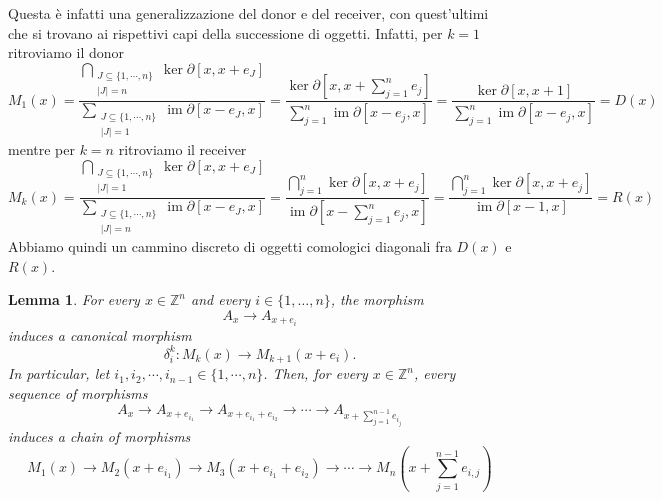 \documentclass[a4paper]{article}
\DeclareMathOperator{\im}{im}
\newtheorem{lemma}[theorem]{Lemma}
\begin{document}
Questa è infatti una generalizzazione del donor e del receiver, con quest'ultimi
che si trovano ai rispettivi capi della successione di oggetti.
Infatti, per \(k=1\) ritroviamo il donor
\[
    M_1(x) = \frac{
        \displaystyle
        \bigcap_{
            \substack{
                J \subseteq \{1, \cdots, n\} \\
                |J| = n
            }
        } \ker\partial\left[
            x, x + e_J
        \right]
    }{
        \displaystyle
        \sum_{
            \substack{
                J \subseteq \{1, \cdots, n\} \\
                |J| = 1
            }
        } \im\partial\left[
            x - e_J, x
        \right]
    }
    = \frac{
        \ker\partial\left[
            x, x + \displaystyle\sum_{j=1}^n e_j
        \right]
    }{
        \displaystyle
        \sum_{j=1}^n
        \im\partial\left[
            x - e_j, x
        \right]
    }
    = \frac{
        \ker\partial\left[
            x, x + 1
        \right]
    }{
        \displaystyle
        \sum_{j=1}^n
        \im\partial\left[
            x - e_j, x
        \right]
    } = D(x)
\]
mentre per \(k=n\) ritroviamo il receiver
\[
    M_k(x) = \frac{
        \displaystyle
        \bigcap_{
            \substack{
                J \subseteq \{1, \cdots, n\} \\
                |J| = 1
            }
        } \ker\partial\left[
            x, x + e_J
        \right]
    }{
        \displaystyle
        \sum_{
            \substack{
                J \subseteq \{1, \cdots, n\} \\
                |J| = n
            }
        } \im\partial\left[
            x - e_J, x
        \right]
    }
    = \frac{
        \displaystyle
        \bigcap_{j=1}^n \ker \partial[x, x + e_j]
    }{
        \im \partial\left[
            x - \displaystyle\sum_{j=1}^n e_j, x
        \right]
    }
    = \frac{
        \displaystyle
        \bigcap_{j=1}^n \ker \partial[x, x + e_j]
    }{
        \im \partial\left[
            x - 1, x
        \right]
    } = R(x)
\]
Abbiamo quindi un cammino discreto di oggetti comologici diagonali fra \(D(x)\) e \(R(x)\).

\begin{lemma}
    For every \(x\in\mathbb Z^n\) and every \(i\in\{1,\dots,n\}\), the morphism
    \[
        A_x\to A_{x+e_i}
    \]
    induces a canonical morphism
    \[
        \delta^k_i \colon
        M_k(x)\to M_{k+1}(x+e_i).
    \]
    In particular, let \(i_1, i_2, \cdots, i_{n-1} \in \{1, \cdots, n\}\).
    Then, for every \(x\in\mathbb Z^n\), every sequence of morphisms
    \[
        A_{x} \to
        A_{x + e_{i_1}} \to
        A_{x + e_{i_1} + e_{i_2}} \to
        \cdots \to
        A_{x + \sum_{j=1}^{n-1} e_{i_{j}}}
    \]
    induces a chain of morphisms
    \[
        M_1\left(x\right) \to
        M_2\left(x + e_{i_1}\right) \to
        M_3\left(x + e_{i_1} + e_{i_2}\right) \to
        \cdots \to
        M_{n}\left(x + \sum_{j=1}^{n-1} e_{i,j}\right)
    \]
\end{lemma}
\end{document}
